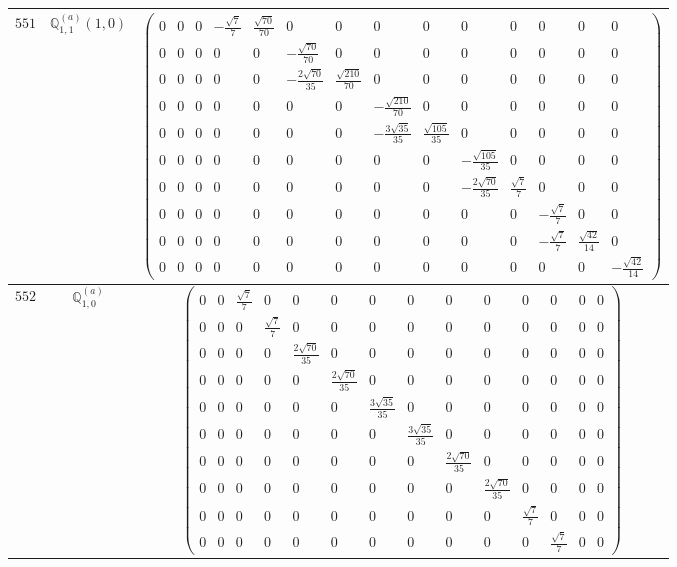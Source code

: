 \documentclass[fleqn,8pt,landscape]{jsarticle}
\begin{document}
\begin{center}
\begin{longtable}{ccc}
$ 551 $ & $ \mathbb{Q}_{1,1}^{(a)}(1,0) $ & $ \begin{pmatrix} 0 & 0 & 0 & - \frac{\sqrt{7}}{7} & \frac{\sqrt{70}}{70} & 0 & 0 & 0 & 0 & 0 & 0 & 0 & 0 & 0 \\ 0 & 0 & 0 & 0 & 0 & - \frac{\sqrt{70}}{70} & 0 & 0 & 0 & 0 & 0 & 0 & 0 & 0 \\ 0 & 0 & 0 & 0 & 0 & - \frac{2 \sqrt{70}}{35} & \frac{\sqrt{210}}{70} & 0 & 0 & 0 & 0 & 0 & 0 & 0 \\ 0 & 0 & 0 & 0 & 0 & 0 & 0 & - \frac{\sqrt{210}}{70} & 0 & 0 & 0 & 0 & 0 & 0 \\ 0 & 0 & 0 & 0 & 0 & 0 & 0 & - \frac{3 \sqrt{35}}{35} & \frac{\sqrt{105}}{35} & 0 & 0 & 0 & 0 & 0 \\ 0 & 0 & 0 & 0 & 0 & 0 & 0 & 0 & 0 & - \frac{\sqrt{105}}{35} & 0 & 0 & 0 & 0 \\ 0 & 0 & 0 & 0 & 0 & 0 & 0 & 0 & 0 & - \frac{2 \sqrt{70}}{35} & \frac{\sqrt{7}}{7} & 0 & 0 & 0 \\ 0 & 0 & 0 & 0 & 0 & 0 & 0 & 0 & 0 & 0 & 0 & - \frac{\sqrt{7}}{7} & 0 & 0 \\ 0 & 0 & 0 & 0 & 0 & 0 & 0 & 0 & 0 & 0 & 0 & - \frac{\sqrt{7}}{7} & \frac{\sqrt{42}}{14} & 0 \\ 0 & 0 & 0 & 0 & 0 & 0 & 0 & 0 & 0 & 0 & 0 & 0 & 0 & - \frac{\sqrt{42}}{14} \end{pmatrix} $ \\ \hline
$ 552 $ & $ \mathbb{Q}_{1,0}^{(a)} $ & $ \begin{pmatrix} 0 & 0 & \frac{\sqrt{7}}{7} & 0 & 0 & 0 & 0 & 0 & 0 & 0 & 0 & 0 & 0 & 0 \\ 0 & 0 & 0 & \frac{\sqrt{7}}{7} & 0 & 0 & 0 & 0 & 0 & 0 & 0 & 0 & 0 & 0 \\ 0 & 0 & 0 & 0 & \frac{2 \sqrt{70}}{35} & 0 & 0 & 0 & 0 & 0 & 0 & 0 & 0 & 0 \\ 0 & 0 & 0 & 0 & 0 & \frac{2 \sqrt{70}}{35} & 0 & 0 & 0 & 0 & 0 & 0 & 0 & 0 \\ 0 & 0 & 0 & 0 & 0 & 0 & \frac{3 \sqrt{35}}{35} & 0 & 0 & 0 & 0 & 0 & 0 & 0 \\ 0 & 0 & 0 & 0 & 0 & 0 & 0 & \frac{3 \sqrt{35}}{35} & 0 & 0 & 0 & 0 & 0 & 0 \\ 0 & 0 & 0 & 0 & 0 & 0 & 0 & 0 & \frac{2 \sqrt{70}}{35} & 0 & 0 & 0 & 0 & 0 \\ 0 & 0 & 0 & 0 & 0 & 0 & 0 & 0 & 0 & \frac{2 \sqrt{70}}{35} & 0 & 0 & 0 & 0 \\ 0 & 0 & 0 & 0 & 0 & 0 & 0 & 0 & 0 & 0 & \frac{\sqrt{7}}{7} & 0 & 0 & 0 \\ 0 & 0 & 0 & 0 & 0 & 0 & 0 & 0 & 0 & 0 & 0 & \frac{\sqrt{7}}{7} & 0 & 0 \end{pmatrix} $ \\ \hline

\end{longtable}
\end{center}
\end{document}

